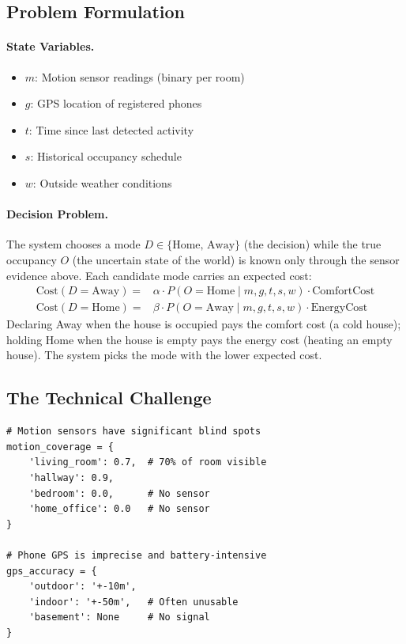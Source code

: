 \subsection{Problem Formulation}

\paragraph{State Variables.}
\begin{itemize}
    \item $m$: Motion sensor readings (binary per room)
    \item $g$: GPS location of registered phones
    \item $t$: Time since last detected activity
    \item $s$: Historical occupancy schedule
    \item $w$: Outside weather conditions
\end{itemize}

\paragraph{Decision Problem.}

The system chooses a mode $D \in \{\text{Home},\, \text{Away}\}$ (the decision) while the true occupancy $O$ (the uncertain state of the world) is known only through the sensor evidence above. Each candidate mode carries an expected cost:
\[
\begin{aligned}
\text{Cost}(D{=}\text{Away}) = {} & \alpha \cdot P(O{=}\text{Home} \mid m, g, t, s, w) \cdot \text{ComfortCost} \\
\text{Cost}(D{=}\text{Home}) = {} & \beta \cdot P(O{=}\text{Away} \mid m, g, t, s, w) \cdot \text{EnergyCost}
\end{aligned}
\]
Declaring Away when the house is occupied pays the comfort cost (a cold house); holding Home when the house is empty pays the energy cost (heating an empty house). The system picks the mode with the lower expected cost.

\subsection{The Technical Challenge}

\begin{lstlisting}[style=python, caption={Sensor limitations of the Nest thermostat}]
# Motion sensors have significant blind spots
motion_coverage = {
    'living_room': 0.7,  # 70% of room visible
    'hallway': 0.9,
    'bedroom': 0.0,      # No sensor
    'home_office': 0.0   # No sensor
}

# Phone GPS is imprecise and battery-intensive
gps_accuracy = {
    'outdoor': '+-10m',
    'indoor': '+-50m',   # Often unusable
    'basement': None     # No signal
}
\end{lstlisting}

